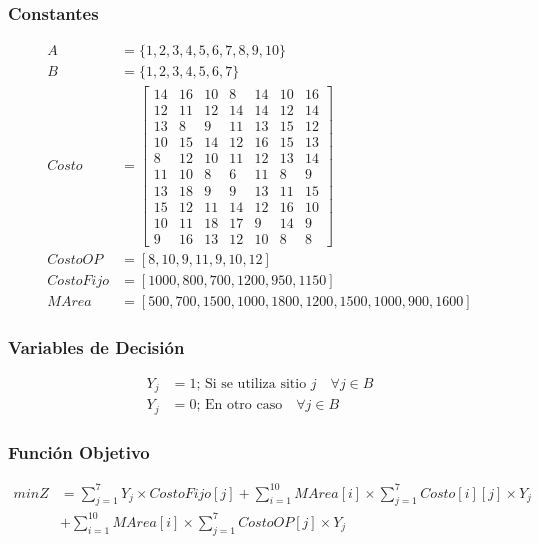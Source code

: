 \documentclass[a4paper,12pt]{article}
\begin{document}
\subsubsection{Constantes}
\begin{equation*}
\begin{split}
A&=\{1,2,3,4,5,6,7,8,9,10\}\\
B&=\{1,2,3,4,5,6,7\}\\
Costo &= \begin{bmatrix}
14 & 16 & 10 & 8 & 14 & 10 & 16\\
12 & 11 & 12 & 14 & 14 & 12 & 14\\
13 & 8 & 9 & 11 & 13 & 15 & 12\\
10 & 15 & 14 & 12 & 16 & 15 & 13\\
8 & 12 & 10 & 11 & 12 & 13 & 14\\
11 & 10 & 8 & 6 & 11 & 8 & 9\\
13 & 18 & 9 & 9 & 13 & 11 & 15\\
15 & 12 & 11 & 14 & 12 & 16 & 10\\
10 & 11 & 18 & 17 & 9 & 14 & 9\\
9 & 16 & 13 & 12 & 10 & 8 & 8
\end{bmatrix}\\
CostoOP&=[8,10,9,11,9,10,12]\\
CostoFijo&=[1000,800,700,1200,950,1150]\\
MArea&=[500,700,1500,1000,1800,1200,1500,1000,900,1600]
\end{split}
\end{equation*}
\subsubsection{Variables de Decisión}
\begin{equation*}
\begin{split}
	Y_j&=1\text{; Si se utiliza sitio } j\quad \forall j \in B\\
	Y_{j}&= 0 \text{; En otro caso}\quad \forall j \in B
\end{split}
\end{equation*}
\subsubsection{Función Objetivo}
\begin{equation*}
\begin{split}
minZ &= \sum_{j=1}^{7}Y_j\times CostoFijo[j] + \sum_{i=1}^{10}MArea[i]\times \sum_{j=1}^{7} Costo[i][j]\times Y_j\\ 
&+ \sum_{i=1}^{10}MArea[i]\times\sum_{j=1}^{7} CostoOP[j]\times Y_j
\end{split}
\end{equation*}
\end{document}

